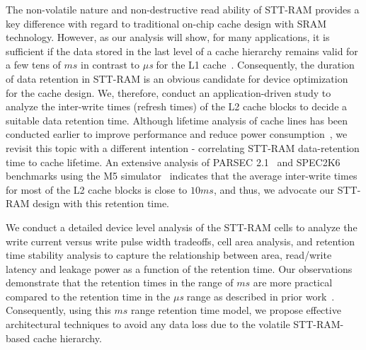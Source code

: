 The non-volatile nature and non-destructive read ability of STT-RAM provides a key difference with
regard to traditional on-chip cache design with SRAM technology. However, as our analysis will show,
for many applications, it is sufficient if the data stored in the last level of a cache hierarchy
remains valid for a few tens of $ms$ in contrast to {\it $\mu$s} for the L1 cache~\cite{3t1d-cache}.
Consequently, the duration of data retention in STT-RAM
is an obvious candidate for device optimization for the cache design. We, therefore, conduct an
application-driven study to analyze the inter-write times (refresh times) of the L2 cache blocks to decide a suitable
data retention time. Although lifetime analysis of cache lines has been conducted earlier to
improve performance and reduce power consumption~\cite{cache-decay-2001,3t1d-cache}, we revisit this
topic with a different intention - correlating STT-RAM data-retention time to cache lifetime. An
extensive analysis of PARSEC 2.1~\cite{bienia11benchmarking} and
SPEC2K6~\cite{spec} benchmarks using the M5 simulator~\cite{M5} indicates that
the average inter-write times for most of the L2 cache blocks is close to $10ms$, and thus, we advocate
our STT-RAM design with this retention time.

We conduct a detailed device level analysis of the STT-RAM cells to analyze the write current versus
write pulse width tradeoffs, cell area analysis, and retention time stability analysis to capture the
relationship between area, read/write latency and leakage power as a function of the retention time. Our observations demonstrate that the retention times in the range of $ms$ are more practical compared to the retention time in the
{\it $\mu$s} range as described in prior work~\cite{STTRAM:HPCA11}. Consequently, using this $ms$ range retention time model, we propose effective
architectural techniques to avoid any data loss due to the volatile STT-RAM-based cache hierarchy.



